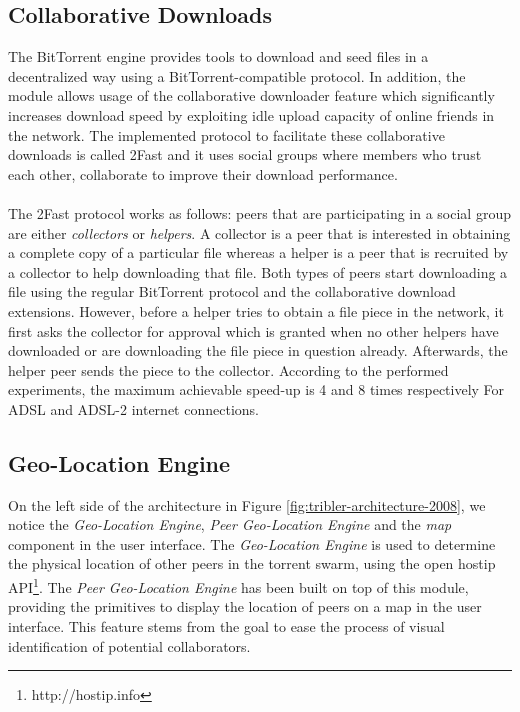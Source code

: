 \subsection{Collaborative Downloads}
The BitTorrent engine provides tools to download and seed files in a decentralized way using a BitTorrent-compatible protocol. In addition, the module allows usage of the collaborative downloader feature which significantly increases download speed by exploiting idle upload capacity of online friends in the network. The implemented protocol to facilitate these collaborative downloads is called 2Fast and it uses social groups where members who trust each other, collaborate to improve their download performance.\\\\
The 2Fast protocol works as follows: peers that are participating in a social group are either \emph{collectors} or \emph{helpers}. A collector is a peer that is interested in obtaining a complete copy of a particular file whereas a helper is a peer that is recruited by a collector to help downloading that file. Both types of peers start downloading a file using the regular BitTorrent protocol and the collaborative download extensions. However, before a helper tries to obtain a file piece in the network, it first asks the collector for approval which is granted when no other helpers have downloaded or are downloading the file piece in question already. Afterwards, the helper peer sends the piece to the collector. According to the performed experiments, the maximum achievable speed-up is 4 and 8 times respectively For ADSL and ADSL-2 internet connections.

\subsection{Geo-Location Engine}
On the left side of the architecture in Figure \ref{fig:tribler-architecture-2008}, we notice the \emph{Geo-Location Engine}, \emph{Peer Geo-Location Engine} and the \emph{map} component in the user interface. The \emph{Geo-Location Engine} is used to determine the physical location of other peers in the torrent swarm, using the open hostip API\footnote{http://hostip.info}. The \emph{Peer Geo-Location Engine} has been built on top of this module, providing the primitives to display the location of peers on a map in the user interface. This feature stems from the goal to ease the process of visual identification of potential collaborators.

